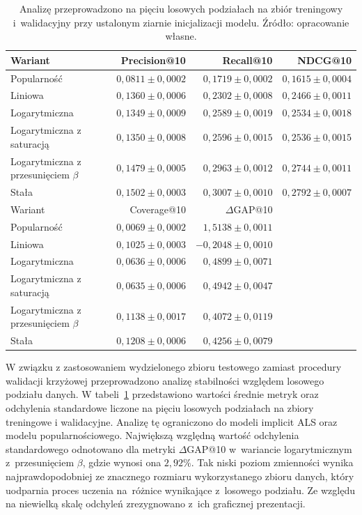 \begin{table}[htbp]
\centering
\caption{Wyniki na zbiorze walidacyjnym wraz z~odchyleniami standardowymi w~pięciu losowych podziałach danych}
\label{tab:stabilnosc-walidacja-zbiorcza}
\begin{tabular}{lrrr}
\toprule
Wariant & Precision@10 & Recall@10 & NDCG@10 \\
\midrule
Popularność & $0{,}0811\pm0{,}0002$ & $0{,}1719\pm0{,}0002$ & $0{,}1615\pm0{,}0004$ \\
Liniowa & $0{,}1360\pm0{,}0006$ & $0{,}2302\pm0{,}0008$ & $0{,}2466\pm0{,}0011$ \\
Logarytmiczna & $0{,}1349\pm0{,}0009$ & $0{,}2589\pm0{,}0019$ & $0{,}2534\pm0{,}0018$ \\
Logarytmiczna z saturacją & $0{,}1350\pm0{,}0008$ & $0{,}2596\pm0{,}0015$ & $0{,}2536\pm0{,}0015$ \\
Logarytmiczna z przesunięciem $\beta$ & $0{,}1479\pm0{,}0005$ & $0{,}2963\pm0{,}0012$ & $0{,}2744\pm0{,}0011$ \\
Stała & $0{,}1502\pm0{,}0003$ & $0{,}3007\pm0{,}0010$ & $0{,}2792\pm0{,}0007$ \\
\midrule
Wariant & Coverage@10 & $\Delta$GAP@10 & \\
\midrule
Popularność & $0{,}0069\pm0{,}0002$ & $1{,}5138\pm0{,}0011$ & \\
Liniowa & $0{,}1025\pm0{,}0003$ & $-0{,}2048\pm0{,}0010$ & \\
Logarytmiczna & $0{,}0636\pm0{,}0006$ & $0{,}4899\pm0{,}0071$ & \\
Logarytmiczna z saturacją & $0{,}0635\pm0{,}0006$ & $0{,}4942\pm0{,}0047$ & \\
Logarytmiczna z przesunięciem $\beta$ & $0{,}1138\pm0{,}0017$ & $0{,}4072\pm0{,}0119$ & \\
Stała & $0{,}1208\pm0{,}0006$ & $0{,}4256\pm0{,}0079$ & \\
\bottomrule
\end{tabular}
\caption*{\footnotesize Analizę przeprowadzono na pięciu losowych podziałach na zbiór treningowy i~walidacyjny przy ustalonym ziarnie inicjalizacji modelu. Źródło: opracowanie własne.}
\end{table}

W związku z zastosowaniem wydzielonego zbioru testowego zamiast procedury walidacji krzyżowej przeprowadzono analizę stabilności względem losowego podziału danych. W tabeli~\ref{tab:stabilnosc-walidacja-zbiorcza} przedstawiono wartości średnie metryk oraz odchylenia standardowe liczone na pięciu losowych podziałach na zbiory treningowe i walidacyjne. Analizę tę ograniczono do modeli implicit ALS oraz modelu popularnościowego. Największą względną wartość odchylenia standardowego odnotowano dla metryki $\Delta$GAP@10 w~wariancie logarytmicznym z~przesunięciem $\beta$, gdzie wynosi ona $2{,}92\%$. Tak niski poziom zmienności wynika najprawdopodobniej ze znacznego rozmiaru wykorzystanego zbioru danych, który uodparnia proces uczenia na~różnice wynikające z~losowego podziału. Ze względu na niewielką skalę odchyleń zrezygnowano z~ich graficznej prezentacji.

